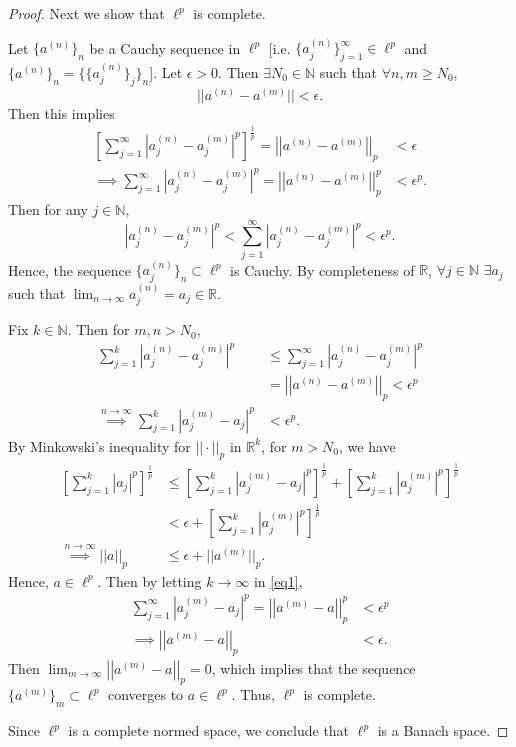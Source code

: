 \documentclass{article}
\begin{document}
\begin{proof}
	Next we show that $\ell^p$ is complete. 
	
	Let $\{a^{(n)}\}_n$ be a Cauchy sequence in $\ell^p$ [i.e. $\{a_j^{(n)}\}_{j=1}^{\infty}\in\ell^p$ and $\{a^{(n)}\}_n=\{\{a_j^{(n)}\}_{j}\}_{n}$]. Let $\epsilon>0$. Then $\exists N_0\in\mathbb{N}$ such that $\forall n,m\geq N_0$,
	\begin{equation}
		||a^{(n)}-a^{(m)}||<\epsilon.
	\end{equation}
	Then this implies
	\begin{align}
		\left[\sum_{j=1}^{\infty}\left|a_j ^{(n)} - a_j ^{(m)}\right|^p\right]^\frac{1}{p} = \left|\left|a^{(n)}-a^{(m)}\right|\right|_p &< \epsilon \\
		\implies \sum_{j=1}^{\infty} \left|a_j ^{(n)} - a_j ^{(m)}\right|^p = \left|\left|a^{(n)}-a^{(m)}\right|\right|_p ^{p} &< \epsilon^p.
	\end{align}
	Then for any $j\in\mathbb{N}$, 
	\begin{equation}
		\left|a_j ^{(n)} - a_j ^{(m)}\right|^p < \sum_{j=1}^{\infty} \left|a_j ^{(n)} - a_j ^{(m)}\right|^p < \epsilon^p.
	\end{equation}
	Hence, the sequence $\{a_j^{(n)}\}_n \subset \ell^p$ is Cauchy. By completeness of $\mathbb{R}$, $\forall j\in\mathbb{N}$ $\exists a_j$ such that $\lim_{n \to \infty} a_j ^{(n)} = a_j \in \mathbb{R}$. 
	
	Fix $k\in\mathbb{N}$. Then for $m,n > N_0$, 
	\begin{align}
		\sum_{j=1}^k \left|a_j ^{(n)}-a_j^{(m)}\right|^p &\leq \sum_{j=1}^{\infty} \left|a_j ^{(n)}-a_j^{(m)}\right|^p \\
		&= \left|\left|a^{(n)}-a^{(m)}\right|\right|_p < \epsilon^p\\
		\overset{n \to \infty}\implies 	\sum_{j=1}^k \left|a_j ^{(m)}-a_j\right|^p &< \epsilon^p. \label{eq1} 
	\end{align}
	By Minkowski's inequality for $||\cdot||_p$ in $\mathbb{R}^k$, for $m>N_0$, we have
	\begin{align}
		\left[\sum_{j=1}^k |a_j|^p\right]^\frac{1}{p} &\leq \left[\sum_{j=1}^k \left|a_j^{(m)}-a_j\right|^p\right]^\frac{1}{p} + \left[\sum_{j=1}^k \left|a_j^{(m)}\right|^p\right]^\frac{1}{p} \\
		&< \epsilon + \left[\sum_{j=1}^k \left|a_j^{(m)}\right|^p\right]^\frac{1}{p} \\
		\overset{n \to \infty}\implies ||a||_p &\leq \epsilon + ||a^{(m)}||_p.
	\end{align}
	Hence, $a \in \ell^p$. Then by letting $k \to \infty$ in \eqref{eq1}, 
	\begin{align}
		\sum_{j=1}^{\infty} \left|a_j ^{(m)}-a_j\right|^p = \left|\left|a^{(m)}-a\right|\right|_p ^{p} &< \epsilon ^p \\
		\implies \left|\left|a^{(m)}-a\right|\right|_p &< \epsilon.  
	\end{align}
	Then $\lim_{m \to \infty} \left|\left|a^{(m)}-a\right|\right|_p = 0$, which implies that the sequence $\{a^{(m)}\}_m \subset \ell^p$  converges to $a\in\ell^p$. Thus, $\ell^p$ is complete.
	
	Since $\ell^p$ is a complete normed space, we conclude that $\ell^p$ is a Banach space. 
\end{proof}
\end{document}
